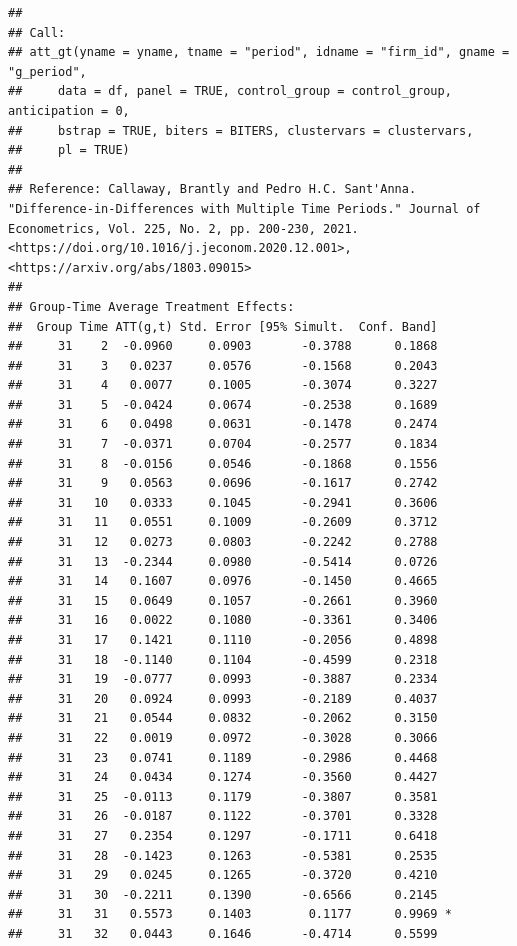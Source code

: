 \documentclass[
]{article}
\begin{document}
\begin{verbatim}
## 
## Call:
## att_gt(yname = yname, tname = "period", idname = "firm_id", gname = "g_period", 
##     data = df, panel = TRUE, control_group = control_group, anticipation = 0, 
##     bstrap = TRUE, biters = BITERS, clustervars = clustervars, 
##     pl = TRUE)
## 
## Reference: Callaway, Brantly and Pedro H.C. Sant'Anna.  "Difference-in-Differences with Multiple Time Periods." Journal of Econometrics, Vol. 225, No. 2, pp. 200-230, 2021. <https://doi.org/10.1016/j.jeconom.2020.12.001>, <https://arxiv.org/abs/1803.09015> 
## 
## Group-Time Average Treatment Effects:
##  Group Time ATT(g,t) Std. Error [95% Simult.  Conf. Band]  
##     31    2  -0.0960     0.0903       -0.3788      0.1868  
##     31    3   0.0237     0.0576       -0.1568      0.2043  
##     31    4   0.0077     0.1005       -0.3074      0.3227  
##     31    5  -0.0424     0.0674       -0.2538      0.1689  
##     31    6   0.0498     0.0631       -0.1478      0.2474  
##     31    7  -0.0371     0.0704       -0.2577      0.1834  
##     31    8  -0.0156     0.0546       -0.1868      0.1556  
##     31    9   0.0563     0.0696       -0.1617      0.2742  
##     31   10   0.0333     0.1045       -0.2941      0.3606  
##     31   11   0.0551     0.1009       -0.2609      0.3712  
##     31   12   0.0273     0.0803       -0.2242      0.2788  
##     31   13  -0.2344     0.0980       -0.5414      0.0726  
##     31   14   0.1607     0.0976       -0.1450      0.4665  
##     31   15   0.0649     0.1057       -0.2661      0.3960  
##     31   16   0.0022     0.1080       -0.3361      0.3406  
##     31   17   0.1421     0.1110       -0.2056      0.4898  
##     31   18  -0.1140     0.1104       -0.4599      0.2318  
##     31   19  -0.0777     0.0993       -0.3887      0.2334  
##     31   20   0.0924     0.0993       -0.2189      0.4037  
##     31   21   0.0544     0.0832       -0.2062      0.3150  
##     31   22   0.0019     0.0972       -0.3028      0.3066  
##     31   23   0.0741     0.1189       -0.2986      0.4468  
##     31   24   0.0434     0.1274       -0.3560      0.4427  
##     31   25  -0.0113     0.1179       -0.3807      0.3581  
##     31   26  -0.0187     0.1122       -0.3701      0.3328  
##     31   27   0.2354     0.1297       -0.1711      0.6418  
##     31   28  -0.1423     0.1263       -0.5381      0.2535  
##     31   29   0.0245     0.1265       -0.3720      0.4210  
##     31   30  -0.2211     0.1390       -0.6566      0.2145  
##     31   31   0.5573     0.1403        0.1177      0.9969 *
##     31   32   0.0443     0.1646       -0.4714      0.5599  

\end{verbatim}
\end{document}
